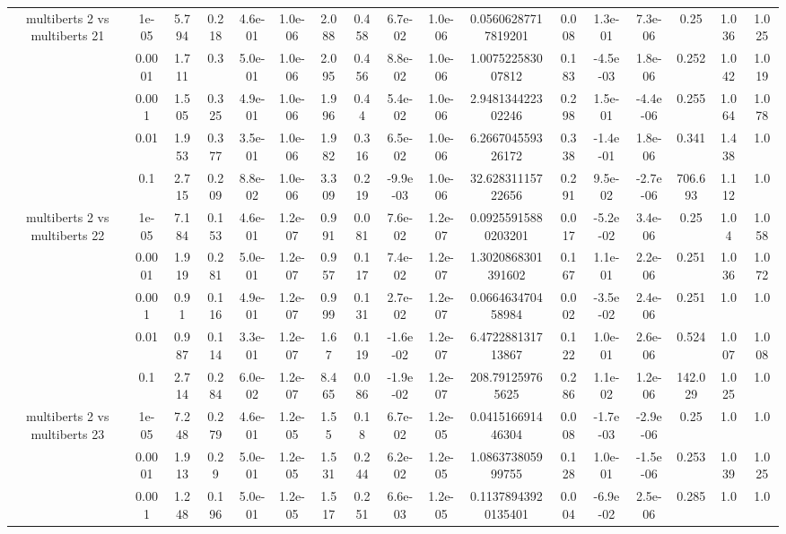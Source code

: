 \begin{tabular}{|c|c|c|c|c|c|c|c|c|c|c|c|c|c|c|c|c|}
\hline
\multirow{5}{*}{multiberts 2 vs multiberts 21} & 1e-05 & 5.794 & 0.218 & 4.6e-01 & 1.0e-06 & 2.088 & 0.458 & 6.7e-02 & 1.0e-06 & 0.05606287717819201 & 0.008 & 1.3e-01 & 7.3e-06 & 0.25 & 1.036 & 1.025 \\
 & 0.0001 & 1.711 & 0.3 & 5.0e-01 & 1.0e-06 & 2.095 & 0.456 & 8.8e-02 & 1.0e-06 & 1.007522583007812 & 0.183 & -4.5e-03 & 1.8e-06 & 0.252 & 1.042 & 1.019 \\
 & 0.001 & 1.505 & 0.325 & 4.9e-01 & 1.0e-06 & 1.996 & 0.44 & 5.4e-02 & 1.0e-06 & 2.948134422302246 & 0.298 & 1.5e-01 & -4.4e-06 & 0.255 & 1.064 & 1.078 \\
 & 0.01 & 1.953 & 0.377 & 3.5e-01 & 1.0e-06 & 1.982 & 0.316 & 6.5e-02 & 1.0e-06 & 6.266704559326172 & 0.338 & -1.4e-01 & 1.8e-06 & 0.341 & 1.438 & 1.0 \\
 & 0.1 & 2.715 & 0.209 & 8.8e-02 & 1.0e-06 & 3.309 & 0.219 & -9.9e-03 & 1.0e-06 & 32.62831115722656 & 0.291 & 9.5e-02 & -2.7e-06 & 706.693 & 1.112 & 1.0 \\
\hline
\multirow{5}{*}{multiberts 2 vs multiberts 22} & 1e-05 & 7.184 & 0.153 & 4.6e-01 & 1.2e-07 & 0.991 & 0.081 & 7.6e-02 & 1.2e-07 & 0.09255915880203201 & 0.017 & -5.2e-02 & 3.4e-06 & 0.25 & 1.04 & 1.058 \\
 & 0.0001 & 1.919 & 0.281 & 5.0e-01 & 1.2e-07 & 0.957 & 0.117 & 7.4e-02 & 1.2e-07 & 1.3020868301391602 & 0.167 & 1.1e-01 & 2.2e-06 & 0.251 & 1.036 & 1.072 \\
 & 0.001 & 0.91 & 0.116 & 4.9e-01 & 1.2e-07 & 0.999 & 0.131 & 2.7e-02 & 1.2e-07 & 0.066463470458984 & 0.002 & -3.5e-02 & 2.4e-06 & 0.251 & 1.0 & 1.0 \\
 & 0.01 & 0.987 & 0.114 & 3.3e-01 & 1.2e-07 & 1.67 & 0.119 & -1.6e-02 & 1.2e-07 & 6.472288131713867 & 0.122 & 1.0e-01 & 2.6e-06 & 0.524 & 1.007 & 1.008 \\
 & 0.1 & 2.714 & 0.284 & 6.0e-02 & 1.2e-07 & 8.465 & 0.086 & -1.9e-02 & 1.2e-07 & 208.791259765625 & 0.286 & 1.1e-02 & 1.2e-06 & 142.029 & 1.025 & 1.0 \\
\hline
\multirow{5}{*}{multiberts 2 vs multiberts 23} & 1e-05 & 7.248 & 0.279 & 4.6e-01 & 1.2e-05 & 1.55 & 0.18 & 6.7e-02 & 1.2e-05 & 0.041516691446304 & 0.008 & -1.7e-03 & -2.9e-06 & 0.25 & 1.0 & 1.0 \\
 & 0.0001 & 1.913 & 0.29 & 5.0e-01 & 1.2e-05 & 1.531 & 0.244 & 6.2e-02 & 1.2e-05 & 1.086373805999755 & 0.128 & 1.0e-01 & -1.5e-06 & 0.253 & 1.039 & 1.025 \\
 & 0.001 & 1.248 & 0.196 & 5.0e-01 & 1.2e-05 & 1.517 & 0.251 & 6.6e-03 & 1.2e-05 & 0.11378943920135401 & 0.004 & -6.9e-02 & 2.5e-06 & 0.285 & 1.0 & 1.0 \\

\end{tabular}
